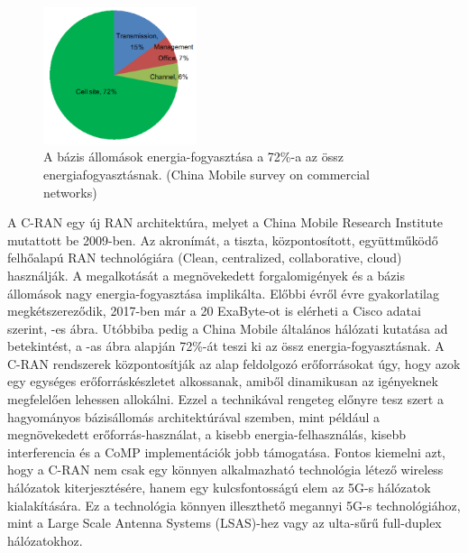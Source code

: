 \hspace{2mm}
\begin{figure}
\captionsetup{format=plain}
\includegraphics[width=0.4\textwidth, keepaspectratio]{figures/power_consumption.png}
\caption{A bázis állomások energia-fogyasztása a 72\%-a az össz energiafogyasztásnak. (China Mobile survey on commercial networks)}
\label{fig:power_consumption}
\vspace{-10pt}
\end{figure}
A C-RAN egy új RAN architektúra, melyet a China Mobile Research Institute mutattott be 2009-ben. Az akronímát, a tiszta, központosított, együttműködő felhőalapú RAN technológiára (Clean, centralized, collaborative, cloud) használják.\cite{RecentCRANProg}
A megalkotását a megnövekedett forgalomigények és a bázis állomások nagy energia-fogyasztása implikálta. Előbbi évről évre gyakorlatilag megkétszereződik, 2017-ben már a 20 ExaByte-ot is elérheti a Cisco adatai szerint, -es ábra. Utóbbiba pedig a China Mobile általános hálózati kutatása ad betekintést, a -as ábra alapján 72\%-át teszi ki az össz energia-fogyasztásnak.
A C-RAN rendszerek központosítják az alap feldolgozó erőforrásokat úgy, hogy azok egy egységes erőforráskészletet alkossanak, amiből dinamikusan az igényeknek megfelelően lehessen allokálni. Ezzel a technikával rengeteg előnyre tesz szert a hagyományos bázisállomás architektúrával szemben, mint például a megnövekedett erőforrás-használat, a kisebb energia-felhasználás, kisebb interferencia és a CoMP implementációk jobb támogatása. \cite{CoMP}
Fontos kiemelni azt, hogy a C-RAN nem csak egy könnyen alkalmazható technológia létező wireless hálózatok kiterjesztésére, hanem egy kulcsfontosságú elem az 5G-s hálózatok kialakítására.
Ez a technológia könnyen illeszthető megannyi 5G-s technológiához, mint a Large Scale Antenna Systems (LSAS)-hez vagy az ulta-sűrű full-duplex hálózatokhoz.\cite{TechOverview}

